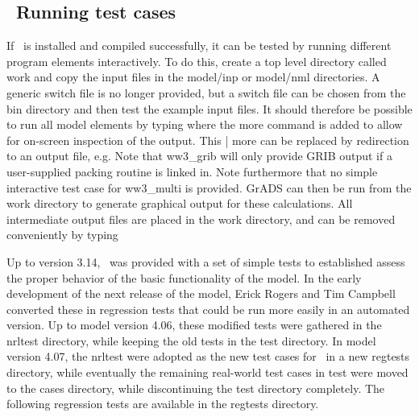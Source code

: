 \vssub
\subsection{~Running test cases} \label{sec:tests}
\vssub

If \ws\ is installed and compiled successfully, it can be tested by running
 different program elements interactively.  To do this, create a top level 
directory called {\file work} and copy the input files in the {\file model/inp} 
or {\file model/nml} 
directories. A generic switch file is no longer provided, but a switch file can be
chosen from the {\file bin} directory and then test the example input files. 
 It should therefore be possible
to run all model elements by typing
where the {\code more} command is added to allow for on-screen inspection of
the output. This {\code | more} can be replaced by redirection to an output
file, e.g.  Note that {\code ww3\_grib}
will only provide GRIB output if a user-supplied packing routine is linked
in. Note furthermore that no simple interactive test case for {\file
ww3\_multi} is provided. GrADS can then be run from the work directory to
generate graphical output for these calculations. All intermediate output
files are placed in the {\file work} directory, and can be removed
conveniently by typing 

Up to version 3.14, \ws\ was provided with a set of simple tests to
established assess the proper behavior of the basic functionality of the
model. In the early development of the next release of the model, Erick Rogers
and Tim Campbell converted these in regression tests that could be run more
easily in an automated version. Up to model version 4.06, these modified tests
were gathered in the {\file nrltest} directory, while keeping the old tests in
the {\file test} directory. In model version 4.07, the {\file nrltest} were
adopted as the new test cases for \ws\ in a new {\file regtests} directory,
while eventually the remaining real-world test cases in {\file test} were
moved to the {\file cases} directory, while discontinuing the {\file test}
directory completely. The following regression tests are available in the
{\file regtests} directory.

